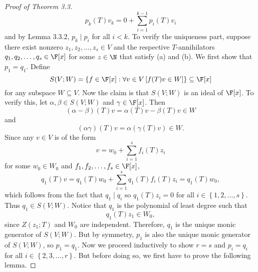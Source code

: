 \documentclass[linearalgebraII]{subfiles}
\begin{document}
\begin{proof}[Proof of Theorem 3.3]
        \begin{equation*}
            p_k(T)v_k = 0 + \sum^{k-1}_{i=1} p_i(T)v_i
        \end{equation*}
        and by Lemma 3.3.2, $p_k\mid p_i$ for all $i<k$. To verify the uniqueness part, suppose there exist nonzero $z_1,z_2,\ldots,z_s\in V$ and the respective $T$-annihilators $q_1,q_2,\ldots,q_s\in\F[x]$ for some $z\in\N$ that satisfy (a) and (b). We first show that $p_1=q_1$. Define
        \begin{equation*}
            S(V;W) = \left\lbrace f\in\F[x]:\forall v\in V \left[ f(T)v\in W \right] \right\rbrace \subseteq \F[x] 
        \end{equation*}
        for any subspace $W\subseteq V$. Now the claim is that $S(V;W)$ is an ideal of $\F[x]$. To verify this, let $\alpha,\beta\in S(V;W)$ and $\gamma\in\F[x]$. Then
        \begin{equation*}
            \left( \alpha-\beta \right) (T)v = \alpha(T)v - \beta(T)v\in W
        \end{equation*}
        and
        \begin{equation*}
            \left( \alpha\gamma \right) (T)v = \alpha\left( \gamma(T)v \right) \in W.
        \end{equation*}
        Since any $v\in V$ is of the form
        \begin{equation*}
            v = w_0 + \sum^{s}_{i=1} f_i(T)z_i
        \end{equation*}
        for some $w_0\in W_0$ and $f_1,f_2,\ldots,f_s\in\F[x]$,
        \begin{equation*}
            q_1(T)v = q_1(T)w_0 + \sum^{s}_{i=1} q_1(T)f_i(T)z_i = q_1(T)w_0,
        \end{equation*}
        which follows from the fact that $q_1\mid q_i$ so $q_1(T)z_i = 0$ for all $i\in \left\lbrace 1,2,\ldots,s \right\rbrace$. Thus $q_1\in S\left( V;W \right)$. Notice that $q_1$ is the polynomial of least degree such that
        \begin{equation*}
            q_1(T)z_1\in W_0,
        \end{equation*}
        since $Z\left( z_1;T \right)$ and $W_0$ are independent. Therefore, $q_1$ is the unique monic generator of $S\left( V;W \right)$. But by symmetry, $p_1$ is also the unique monic generator of $S\left( V;W \right) $, so $p_1=q_1$. Now we proceed inductively to show $r=s$ and $p_i=q_i$ for all $i\in\left\lbrace 2,3,\ldots,r \right\rbrace $. But before doing so, we first have to prove the following lemma. \suppressqedsym
    \end{proof}
\end{document}
